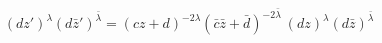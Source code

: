 \begin{equation}
(dz')^{\lambda} (d\bar{z}')^{\bar{\lambda}}= (cz+d)^{-2\lambda}(\bar{c}
\bar{z}+\bar{d})^{-2\bar{\lambda}}~(dz)^{\lambda} (d\bar{z})^{\bar{\lambda}}
\end{equation}

